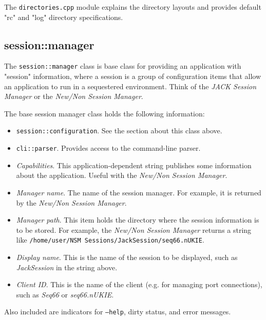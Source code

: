    The \texttt{directories.cpp} module explains the directory layouts
   and provides default "rc" and "log" directory specifications.

\subsection{session::manager}
\label{subsec:session_namespace_manager}

   The \texttt{session::manager} class is base class for providing an
   application with "session" information, where a session is a group of
   configuration items that allow an application to run in a sequestered
   environment. Think of the \textsl{JACK Session Manager} or the 
   \textsl{New/Non Session Manager}.

   The base session manager class holds the following information:

   \begin{itemize}
      \item \texttt{session::configuration}.
         See the section about this class above.
      \item \texttt{cli::parser}.
         Provides access to the command-line parser.
      \item \textsl{Capabilities}.
         This application-dependent string publishes some information about
         the application. Useful with the
         \textsl{New/Non Session Manager}.
      \item \textsl{Manager name}.
         The name of the session manager. For example, it is returned by the
         \textsl{New/Non Session Manager}.
      \item \textsl{Manager path}.
         This item holds the directory where the session information is to
         be stored.
         For example, the \textsl{New/Non Session Manager} returns a string
         like
         \texttt{/home/user/NSM Sessions/JackSession/seq66.nUKIE}.
      \item \textsl{Display name}.
         This is the name of the session to be displayed, such as
         \textsl{JackSession} in the string above.
      \item \textsl{Client ID}.
         This is the name of the client (e.g. for managing port
         connections), such as \textsl{Seq66} or \textsl{seq66.nUKIE}.
   \end{itemize}

   Also included are indicators for \texttt{--help}, dirty status, and error
   messages.

